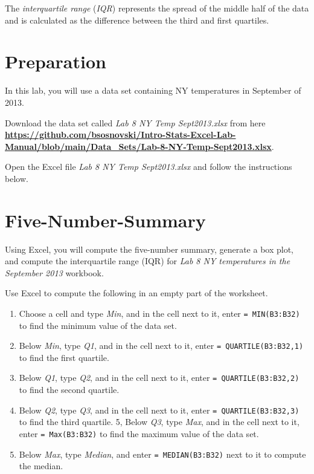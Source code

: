 \documentclass[
]{book}
\providecommand{\tightlist}{%
  \setlength{\itemsep}{0pt}\setlength{\parskip}{0pt}}
\begin{document}
The \emph{interquartile range} (\emph{IQR}) represents the spread of the middle half of the data and is calculated as the difference between the third and first quartiles.

\hypertarget{preparation-5}{%
\section{Preparation}\label{preparation-5}}

In this lab, you will use a data set containing NY temperatures in September of 2013.

Download the data set called \emph{Lab 8 NY Temp Sept2013.xlsx} from here \href{https://github.com/bsosnovski/Intro-Stats-Excel-Lab-Manual/blob/main/Data_Sets/Lab-8-NY-Temp-Sept2013.xlsx}{\textbf{https://github.com/bsosnovski/Intro-Stats-Excel-Lab-Manual/blob/main/Data\_Sets/Lab-8-NY-Temp-Sept2013.xlsx}}.

Open the Excel file \emph{Lab 8 NY Temp Sept2013.xlsx} and follow the instructions below.

\hypertarget{five-number-summary}{%
\section{Five-Number-Summary}\label{five-number-summary}}

Using Excel, you will compute the five-number summary, generate a box plot, and compute the interquartile range (IQR) for \emph{Lab 8 NY temperatures in the September 2013} workbook.

Use Excel to compute the following in an empty part of the worksheet.

\begin{enumerate}
\def\labelenumi{\arabic{enumi}.}
\tightlist
\item
  Choose a cell and type \emph{Min}, and in the cell next to it, enter \texttt{=\ MIN(B3:B32)} to find the minimum value of the data set.
\item
  Below \emph{Min}, type \emph{Q1}, and in the cell next to it, enter \texttt{=\ QUARTILE(B3:B32,1)} to find the first quartile.
\item
  Below \emph{Q1}, type \emph{Q2}, and in the cell next to it, enter \texttt{=\ QUARTILE(B3:B32,2)} to find the second quartile.
\item
  Below \emph{Q2}, type \emph{Q3}, and in the cell next to it, enter \texttt{=\ QUARTILE(B3:B32,3)} to find the third quartile.
  5, Below \emph{Q3}, type \emph{Max}, and in the cell next to it, enter \texttt{=\ Max(B3:B32)} to find the maximum value of the data set.
\item
  Below \emph{Max}, type \emph{Median}, and enter \texttt{=\ MEDIAN(B3:B32)} next to it to compute the median.
\end{enumerate}
\end{document}
